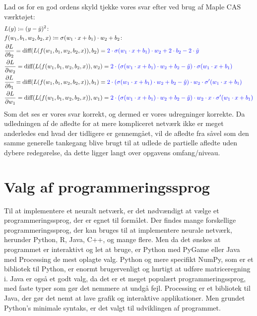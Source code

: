 \documentclass{article}
\begin{document}
Lad os for en god ordens skyld tjekke vores svar efter ved brug af Maple CAS værktøjet:
\begin{align}
  &L(y)\coloneqq(y-\hat{y})^{2}\colon\\
  &f(w_{1},b_{1},w_{2},b_{2},x)\coloneqq\sigma(w_{1}\cdot x+b_{1})\cdot w_{2}+b_{2}\colon\\
  &\frac{\partial L}{\partial b_{2}}=\text{diff}(L(f(w_{1},b_{1},w_{2},b_{2},x)),b_2)=\color{blue}2\cdot\sigma(w_{1}\cdot x+b_{1})\cdot w_{2}+2\cdot b_{2}-2\cdot\hat{y}\\
  &\frac{\partial L}{\partial w_{2}}= \text{diff}(L(f(w_{1},b_{1},w_{2},b_{2},x)),w_2)=\color{blue}2\cdot(\sigma(w_{1}\cdot x+b_{1})\cdot w_{2}+b_{2}-\hat{y})\cdot\sigma(w_{1}\cdot x+b_{1})\\
  &\frac{\partial L}{\partial b_{1}}= \text{diff}(L(f(w_{1},b_{1},w_{2},b_{2},x)),b_1)=\color{blue}2\cdot(\sigma(w_{1}\cdot x+b_{1})\cdot w_{2}+b_{2}-\hat{y})\cdot w_{2}\cdot\sigma'(w_{1}\cdot x+b_{1})\\
  &\frac{\partial L}{\partial w_{1}}= \text{diff}(L(f(w_{1},b_{1},w_{2},b_{2},x)),w_1)=\color{blue}2\cdot(\sigma(w_{1}\cdot x+b_{1})\cdot w_{2}+b_{2}-\hat{y})\cdot w_{2}\cdot x\cdot\sigma'(w_{1}\cdot x+b_{1})
\end{align}
Som det ses er vores svar korrekt, og dermed er vores udregninger korrekte. Da udledningen af de afledte for at mere kompliceret netværk ikke er meget anderledes end hvad der tidligere er gennemgået, vil de afledte fra \parencite{keita2023backpropagation,verma2020neuralnet,kurbiel2021softmax} såvel som den samme generelle tankegang blive brugt til at udlede de partielle afledte uden dybere redegørelse, da dette ligger langt over opgavens omfang/niveau.
\section{Valg af programmeringssprog}
Til at implementere et neuralt netværk, er det nødvændigt at vælge et programmeringssprog, der er egnet til formålet. Der findes mange forskellige programmeringssprog, der kan bruges til at implementere neurale netværk, herunder Python, R, Java, C++, og mange flere. Men da det ønskes at programmet er interaktivt og let at bruge, er Python med PyGame eller Java med Processing de mest oplagte valg. Python og mere specifikt NumPy, som er et bibliotek til Python, er enormt brugervenligt og hurtigt at udføre matriceregning i. Java er også et godt valg, da det er et meget populært programmeringssprog, med faste typer som gør det nemmere at undgå fejl. Processing er et bibliotek til Java, der gør det nemt at lave grafik og interaktive applikationer. Men grundet Python's minimale syntaks, er det valgt til udviklingen af programmet.
\end{document}
